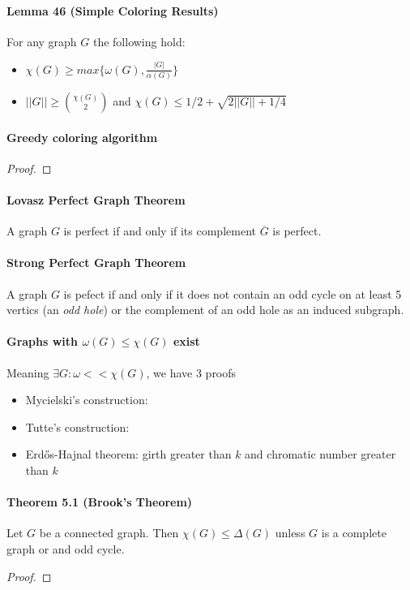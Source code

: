 \paragraph{Lemma 46 (Simple Coloring Results)} $ $ \\
For any graph $G$ the following hold: 
\begin{itemize}
    \item $\chi(G) \geq max\{\omega(G), \frac{|G|}{\alpha(G)}\} $
    \item $||G|| \geq \binom{\chi(G)}{2}$ and $ \chi(G) \leq 1/2 + 
    \sqrt{2||G||+1/4}$
\end{itemize}

\paragraph{Greedy coloring algorithm}
\begin{proof}
     {\color{red}{TODO}}
\end{proof}

\paragraph{Lovasz Perfect Graph Theorem}
A graph $G$ is perfect if and only if its complement $\overline{G}$ is perfect.

\paragraph{Strong Perfect Graph Theorem} A graph $G$ is pefect if and only 
if it does not contain an odd cycle on at least 5 vertics (an \textit{odd hole})
or the complement of an odd hole as an induced subgraph.

\paragraph{Graphs with $\omega(G) \leq \chi(G)$ exist}
Meaning $ \exists G: \omega << \chi(G)$, we have 3 proofs 
\begin{itemize}
    \item Mycielski's construction: {\color{red}{TODO}}
    \item Tutte's construction: {\color{red}{TODO}}
    \item Erd\H{o}s-Hajnal theorem: girth greater than $k$ and chromatic 
    number greater than $k$
\end{itemize}

\paragraph{Theorem 5.1 (Brook's Theorem)} Let $ G $ be a connected graph.
Then $ \chi(G) \leq \Delta(G) $ unless $G$ is a complete graph or and odd cycle.
\begin{proof}
    {\color{red}{TODO}}
\end{proof}

